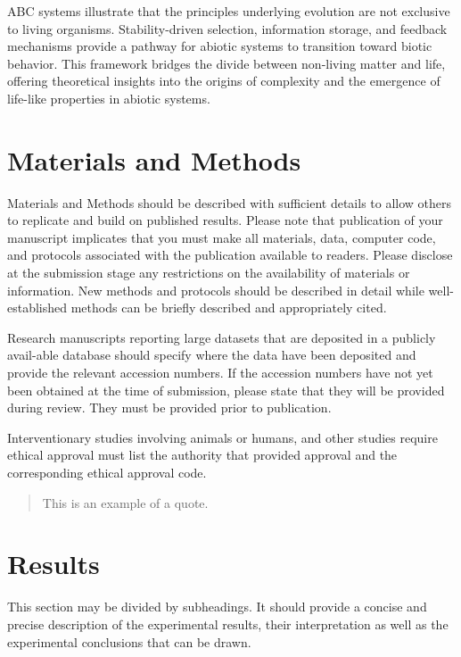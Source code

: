 \documentclass[entropy,article,submit,pdftex,moreauthors]{Definitions/mdpi}
\begin{document}
ABC systems illustrate that the principles underlying evolution are not exclusive to living organisms. Stability-driven selection, information storage, and feedback mechanisms provide a pathway for abiotic systems to transition toward biotic behavior. This framework bridges the divide between non-living matter and life, offering theoretical insights into the origins of complexity and the emergence of life-like properties in abiotic systems.


\section{Materials and Methods}

Materials and Methods should be described with sufficient details to allow others to replicate and build on published results. Please note that publication of your manuscript implicates that you must make all materials, data, computer code, and protocols associated with the publication available to readers. Please disclose at the submission stage any restrictions on the availability of materials or information. New methods and protocols should be described in detail while well-established methods can be briefly described and appropriately cited.

Research manuscripts reporting large datasets that are deposited in a publicly avail-able database should specify where the data have been deposited and provide the relevant accession numbers. If the accession numbers have not yet been obtained at the time of submission, please state that they will be provided during review. They must be provided prior to publication.

Interventionary studies involving animals or humans, and other studies require ethical approval must list the authority that provided approval and the corresponding ethical approval code.
\begin{quote}
This is an example of a quote.
\end{quote}

\section{Results}

This section may be divided by subheadings. It should provide a concise and precise description of the experimental results, their interpretation as well as the experimental conclusions that can be drawn.
\end{document}
